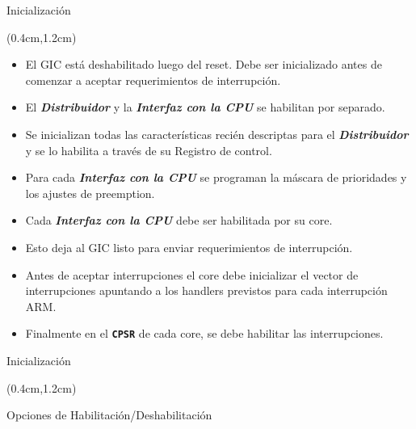 \documentclass[table,x11names,aspectratio=169]{beamer}
\begin{document}
\begin{frame}[t]{Inicialización}
 \begin{textblock*}{\textwidth}(0.4cm,1.2cm)
  \begin{itemize}[<+(1)->]\justifying%
   \item El GIC está deshabilitado luego del reset. Debe ser inicializado antes de comenzar a aceptar requerimientos de interrupción.
   \item El \textbf{\textit{Distribuidor}} y la \textbf{\textit{Interfaz con la CPU}} se habilitan por separado.
   \item Se inicializan todas las características recién descriptas para el \textbf{\textit{Distribuidor}} y se lo habilita a través de su Registro de control.
   \item Para cada \textbf{\textit{Interfaz con la CPU}} se programan la máscara de prioridades y los ajustes de preemption.
   \item Cada \textbf{\textit{Interfaz con la CPU}} debe ser habilitada por su core. 
   \item Esto deja al GIC listo para enviar requerimientos de interrupción.
   \item Antes de aceptar interrupciones el core debe inicializar el vector de interrupciones apuntando a los handlers previstos para cada interrupción ARM.
   \item Finalmente en el \textbf{\texttt{CPSR}} de cada core, se debe habilitar las interrupciones.
  \end{itemize}
 \end{textblock*}
\end{frame}

\begin{frame}[t]{Inicialización}
 \begin{textblock*}{\textwidth}(0.4cm,1.2cm)
  \begin{block}{Opciones de Habilitación/Deshabilitación}\justifying
   
   
  \end{block}
 \end{textblock*}
\end{frame}
\end{document}
